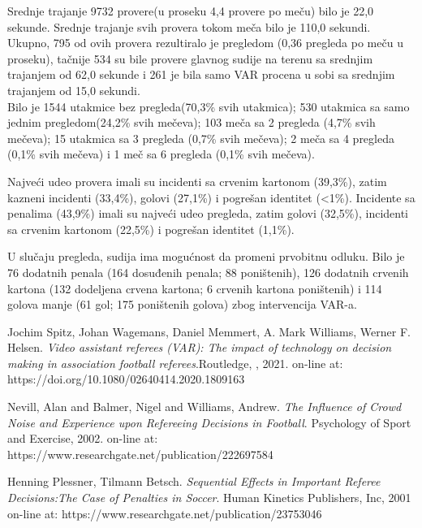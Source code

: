 \documentclass[a4paper]{article}
\begin{document}
Srednje trajanje 9732 provere(u proseku 4,4 provere po meču) bilo je 22,0 sekunde. Srednje trajanje svih provera tokom meča bilo je 110,0 sekundi. 
Ukupno, 795 od ovih provera rezultiralo je pregledom (0,36 pregleda po meču u proseku), tačnije 534 su bile provere glavnog sudije na terenu sa srednjim trajanjem od 62,0 sekunde i 261 je bila samo VAR procena u sobi sa srednjim trajanjem od 15,0 sekundi. \\

Bilo je 1544 utakmice bez pregleda(70,3\% svih utakmica); 530 utakmica sa samo jednim pregledom(24,2\% svih mečeva); 103 meča sa 2 pregleda (4,7\% svih mečeva); 15 utakmica sa 3 pregleda (0,7\% svih mečeva); 2 meča sa 4 pregleda (0,1\% svih mečeva) i 1 meč sa 6 pregleda (0,1\% svih mečeva).

Najveći udeo provera imali su incidenti sa crvenim kartonom (39,3\%), zatim kazneni incidenti (33,4\%), golovi (27,1\%) i pogrešan identitet (<1\%). Incidente sa penalima (43,9\%) imali su najveći udeo pregleda, zatim golovi (32,5\%), incidenti sa crvenim kartonom (22,5\%) i pogrešan identitet (1,1\%).

U slučaju pregleda, sudija ima mogućnost da promeni prvobitnu odluku. Bilo je 76 dodatnih penala (164 dosuđenih penala; 88 poništenih), 126 dodatnih crvenih kartona (132 dodeljena crvena kartona; 6 crvenih kartona poništenih) i 114 golova manje (61 gol; 175 poništenih golova) zbog intervencija VAR-a.

\appendix

\iffalse
 

\fi

\begin{thebibliography}{9}

\bibitem{} Jochim Spitz, Johan Wagemans, Daniel Memmert, A. Mark Williams, Werner F. Helsen. \emph{Video assistant referees (VAR): The impact of technology on decision making in association football referees}.Routledge, , 2021. on-line at: https://doi.org/10.1080/02640414.2020.1809163

\bibitem{} Nevill, Alan and Balmer, Nigel and Williams, Andrew.  \emph{The Influence of Crowd Noise and Experience upon Refereeing Decisions in Football}. Psychology of Sport and Exercise, 2002. on-line at: https://www.researchgate.net/publication/222697584

\bibitem{} Henning Plessner, Tilmann Betsch. \emph{Sequential Effects in Important Referee Decisions:The Case of Penalties in Soccer}. Human Kinetics Publishers, Inc, 2001 on-line at: https://www.researchgate.net/publication/23753046


\end{thebibliography}
\end{document}
